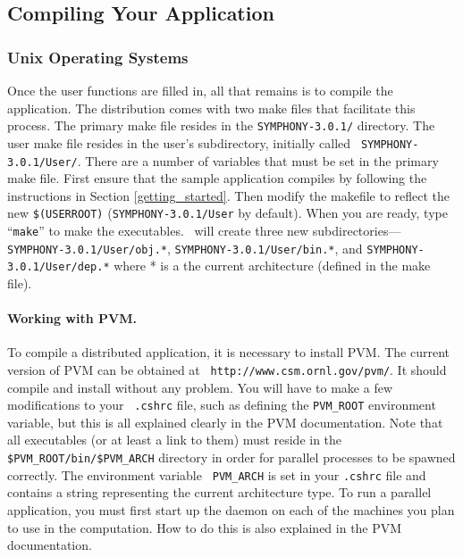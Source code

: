 \subsection{Compiling Your Application}

\subsubsection{Unix Operating Systems}

Once the user functions are filled in, all that remains is to compile the
application. The distribution comes with two make files that facilitate this
process. The primary make file resides in the {\tt SYMPHONY-3.0.1/} directory.
The user make file resides in the user's subdirectory, initially called {\tt
SYMPHONY-3.0.1/User/}. There are a number of variables that must be set in the
primary make file. First ensure that the sample application compiles by
following the instructions in Section \ref{getting_started}. Then modify the
makefile to reflect the new {\tt \$(USERROOT)} ({\tt SYMPHONY-3.0.1/User} by
default). When you are ready, type ``{\tt make}'' to make the executables.
\BB\ will create three new subdirectories---{\tt SYMPHONY-3.0.1/User/obj.*}, 
{\tt SYMPHONY-3.0.1/User/bin.*}, and {\tt SYMPHONY-3.0.1/User/dep.*} where *
is a the current architecture (defined in the make file).

\paragraph{Working with PVM.}
\label{PVM}
To compile a distributed application, it is necessary to install PVM.
The current version of PVM can be obtained at {\tt
{}
{http://www.csm.ornl.gov/pvm/}}. It should compile and install without
any problem. You will have to make a few modifications to your {\tt
.cshrc} file, such as defining the {\tt PVM\_ROOT} environment
variable, but this is all explained clearly in the PVM documentation.
Note that all executables (or at least a link to them) must reside in
the {\tt \$PVM\_ROOT/bin/\$PVM\_ARCH} directory in order for parallel
processes to be spawned correctly. The environment variable {\tt
PVM\_ARCH} is set in your {\tt .cshrc} file and contains a string
representing the current architecture type. To run a parallel
application, you must first start up the daemon on each of the
machines you plan to use in the computation. How to do this is also
explained in the PVM documentation.

